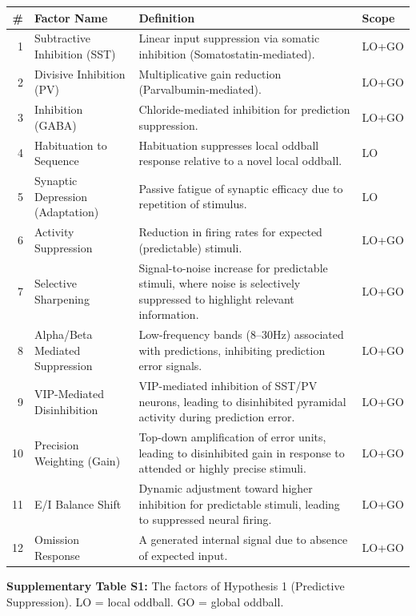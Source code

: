 \documentclass[12pt]{article}
\begin{document}
\begingroup
\small
\noindent\begin{tabularx}{\textwidth}{@{}r p{1.6in} >{\raggedright\arraybackslash}X l@{}}
\toprule
\textbf{\#} & \textbf{Factor Name} & \textbf{Definition} & \textbf{Scope} \\
\midrule
1 & Subtractive Inhibition (SST) & Linear input suppression via somatic inhibition (Somatostatin-mediated). & LO+GO \\
2 & Divisive Inhibition (PV) & Multiplicative gain reduction (Parvalbumin-mediated). & LO+GO \\
3 & Inhibition (GABA) & Chloride-mediated inhibition for prediction suppression. & LO+GO \\
4 & Habituation to Sequence & Habituation suppresses local oddball response relative to a novel local oddball. & LO \\
5 & Synaptic Depression (Adaptation) & Passive fatigue of synaptic efficacy due to repetition of stimulus. & LO \\
6 & Activity Suppression & Reduction in firing rates for expected (predictable) stimuli. & LO+GO \\
7 & Selective Sharpening & Signal-to-noise increase for predictable stimuli, where noise is selectively suppressed to highlight relevant information. & LO+GO \\
8 & Alpha/Beta Mediated Suppression & Low-frequency bands (8--30Hz) associated with predictions, inhibiting prediction error signals. & LO+GO \\
9 & VIP-Mediated Disinhibition & VIP-mediated inhibition of SST/PV neurons, leading to disinhibited pyramidal activity during prediction error. & LO+GO \\
10 & Precision Weighting (Gain) & Top-down amplification of error units, leading to disinhibited gain in response to attended or highly precise stimuli. & LO+GO \\
11 & E/I Balance Shift & Dynamic adjustment toward higher inhibition for predictable stimuli, leading to suppressed neural firing. & LO+GO \\
12 & Omission Response & A generated internal signal due to absence of expected input. & LO+GO \\
\bottomrule
\end{tabularx}
\endgroup
\vspace{0.4em}

\noindent\textbf{Supplementary Table S1:} The factors of Hypothesis 1 (Predictive Suppression). LO = local oddball. GO = global oddball.
\end{document}
